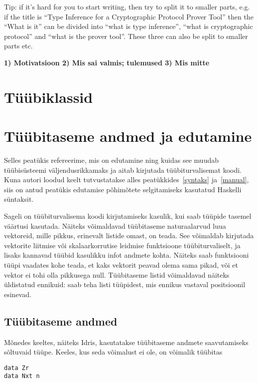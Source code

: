 \documentclass[12pt]{article}
\newcommand\peatykk[1]{
  \clearpage
  \section{#1}}
\newcommand\markus[1]{\textcolor{roheline}{\textbf{#1}}}
\begin{document}
    Tip: if it's hard for you to start writing, then try to split it to smaller parts, e.g. if the title is ``Type Inference for a Cryptographic Protocol Prover Tool'' then the ``What is it'' can be divided into ``what is type inference'', ``what is cryptographic protocol'' and ``what is the prover tool''. These three can also be split to smaller parts etc.

    \markus{1) Motivatsioon 2) Mis sai valmis; tulemused 3) Mis mitte}
  \peatykk{Tüübiklassid}
    
  \peatykk{Tüübitaseme andmed ja edutamine}
    Selles peatükis refereerime, mis on edutamine ning kuidas see muudab tüübisüsteemi väljendusrikkamaks ja aitab kirjutada tüübiturvalisemat koodi. Kuna autori loodud keelt tutvustatakse alles peatükkides~\ref{syntaks} ja~\ref{manual}, siis on antud peatükis edutamise põhimõtete selgitamiseks kasutatud Haskelli süntaksit.

    Sageli on tüübiturvalisema koodi kirjutamiseks kasulik, kui saab tüüpide tasemel väärtusi kasutada. Näiteks võimaldavad tüübitaseme naturaalarvud luua vektoreid, mille pikkus, erinevalt listide omast, on teada. See võimaldab kirjutada vektorite liitmise või skalaarkorrutise leidmise funktsioone tüübiturvaliselt, ja lisaks kannavad tüübid kasulikku infot andmete kohta. Näiteks saab funktsiooni tüüpi vaadates kohe teada, et kaks vektorit peavad olema sama pikad, või et vektor ei tohi olla pikkusega null. Tüübitaseme listid võimaldavad näiteks üldistatud ennikuid: saab teha listi tüüpidest, mis ennikus vastaval positsioonil esinevad.
    \subsection{Tüübitaseme andmed}
      Mõnedes keeltes, näiteks Idris, kasutatakse tüübitaseme andmete saavutamiseks sõltuvaid tüüpe. Keeles, kus seda võimalust ei ole, on võimalik tüübitas

      \begin{verbatim}data Zr
data Nxt n\end{verbatim}
\end{document}
